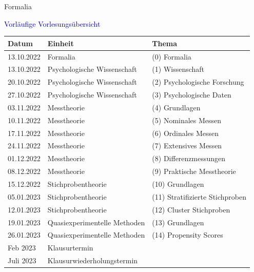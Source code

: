 \documentclass[
  8pt,
  ignorenonframetext,
]{beamer}
\begin{document}
\begin{frame}[t]{Formalia}
\protect\hypertarget{formalia-4}{}
\vspace{1mm}

\textcolor{darkblue}{Vorläufige Vorlesungsübersicht}

\small
\center
\footnotesize
\renewcommand{\arraystretch}{1.1}
\begin{tabular}{lll}
Datum        & Einheit                       & Thema                                            \\\hline
13.10.2022   & Formalia                      & (0) Formalia                             \\
13.10.2022   & Psychologische Wissenschaft   & (1) Wissenschaft                         \\
20.10.2022   & Psychologische Wissenschaft   & (2) Psychologische Forschung             \\
27.10.2022   & Psychologische Wissenschaft   & (3) Psychologische Daten                 \\
03.11.2022   & Messtheorie                   & (4) Grundlagen                           \\
10.11.2022   & Messtheorie                   & (5) Nominales Messen                     \\
17.11.2022   & Messtheorie                   & (6) Ordinales Messen                     \\
24.11.2022   & Messtheorie                   & (7) Extensives Messen                    \\
01.12.2022   & Messtheorie                   & (8) Differenzmessungen                   \\
08.12.2022   & Messtheorie                   & (9) Praktische Messtheorie               \\
15.12.2022   & Stichprobentheorie            & (10) Grundlagen                          \\
05.01.2023   & Stichprobentheorie            & (11) Stratifizierte Stichproben          \\
12.01.2023   & Stichprobentheorie            & (12) Cluster Stichproben                   \\
19.01.2023   & Quasiexperimentelle Methoden  & (13) Grundlagen                          \\
26.01.2023   & Quasiexperimentelle Methoden  & (14) Propensity Scores                   \\\hline
Feb  2023    & Klausurtermin                 &                                          \\
Juli 2023    & Klausurwiederholungstermin    &
\end{tabular}
\end{frame}
\end{document}
